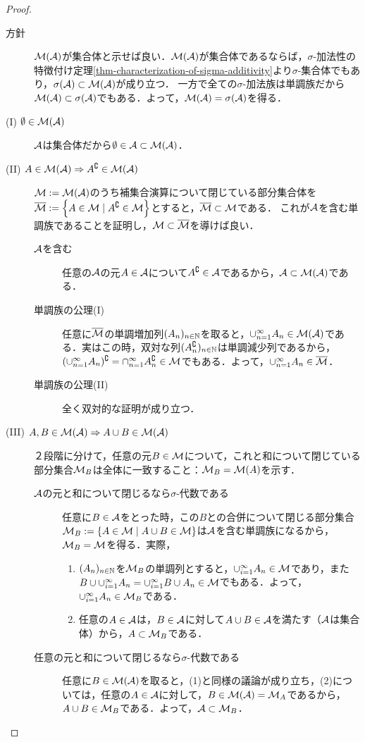 \documentclass[uplatex, dvipdfmx]{jsreport}
\begin{document}
\begin{proof}\mbox{}
    \begin{description}
        \item[方針] $\mathcal{M}(\mathcal{A})$が集合体と示せば良い．$\mathcal{M}(\mathcal{A})$が集合体であるならば，$\sigma$-加法性の特徴付け定理\ref{thm-characterization-of-sigma-additivity}より$\sigma$-集合体でもあり，$\sigma(\mathcal{A})\subset\mathcal{M}(\mathcal{A})$が成り立つ．
        一方で全ての$\sigma$-加法族は単調族だから$\mathcal{M}(\mathcal{A})\subset\sigma(\mathcal{A})$でもある．よって，$\mathcal{M}(\mathcal{A})=\sigma(\mathcal{A})$を得る．
        \item[(I) $\emptyset\in\mathcal{M}(\mathcal{A})$]
        $\mathcal{A}$は集合体だから$\emptyset\in\mathcal{A}\subset\mathcal{M}(\mathcal{A})$．
        \item[(II) $A\in\mathcal{M}(\mathcal{A})\Rightarrow A^\complement\in\mathcal{M}(\mathcal{A})$]
        $\mathcal{M}:=\mathcal{M}(\mathcal{A})$のうち補集合演算について閉じている部分集合体を$\overline{\mathcal{M}}:=\left\{A\in\mathcal{M}\mid A^\complement\in\mathcal{M}\right\}$とすると，$\overline{\mathcal{M}}\subset\mathcal{M}$である．
        これが$\mathcal{A}$を含む単調族であることを証明し，$\mathcal{M}\subset\overline{\mathcal{M}}$を導けば良い．
        \begin{description}
            \item[$\mathcal{A}$を含む] 任意の$\mathcal{A}$の元$A\in\mathcal{A}$について$A^\complement\in\mathcal{A}$であるから，$\mathcal{A}\subset\mathcal{M}(\mathcal{A})$である．
            \item[単調族の公理(I)] 任意に$\overline{\mathcal{M}}$の単調増加列$(A_n)_{n\in\mathbb{N}}$を取ると，$\cup^\infty_{n=1}A_n\in\mathcal{M}(\mathcal{A})$である．実はこの時，双対な列$(A_n^\complement)_{n\in\mathbb{N}}$は単調減少列であるから，$(\cup^\infty_{n=1}A_n)^\complement=\cap^\infty_{n=1}A_n^\complement\in\mathcal{M}$でもある．よって，$\cup^\infty_{n=1}A_n\in\overline{\mathcal{M}}$．
            \item[単調族の公理(II)] 全く双対的な証明が成り立つ．
        \end{description}
        \item[(III) $A,B\in\mathcal{M}(\mathcal{A})\Rightarrow A\cup B\in\mathcal{M}(\mathcal{A})$] ２段階に分けて，任意の元$B\in\mathcal{M}$について，これと和について閉じている部分集合$\mathcal{M}_B$は全体に一致すること：$\mathcal{M}_B=\mathcal{M}(A)$を示す．
            \begin{description}
                \item[$\mathcal{A}$の元と和について閉じるなら$\sigma$-代数である] 任意に$B\in\mathcal{A}$をとった時，この$B$との合併について閉じる部分集合$\mathcal{M}_B:=\left\{A\in\mathcal{M}\mid A\cup B\in\mathcal{M}\right\}$は$\mathcal{A}$を含む単調族になるから，$\mathcal{M}_B=\mathcal{M}$を得る．実際，
                \begin{enumerate}
                    \item $(A_n)_{n\in\mathbb{N}}$を$\mathcal{M}_B$の単調列とすると，$\cup_{i=1}^\infty A_n\in\mathcal{M}$であり，また$B\cup\cup_{i=1}^\infty A_n=\cup_{i=1}^\infty B\cup A_n\in\mathcal{M}$でもある．よって，$\cup_{i=1}^\infty A_n\in\mathcal{M}_B$である．
                    \item 任意の$A\in\mathcal{A}$は，$B\in\mathcal{A}$に対して$A\cup B\in\mathcal{A}$を満たす（$\mathcal{A}$は集合体）から，$A\subset\mathcal{M}_B$である．
                \end{enumerate}
                \item[任意の元と和について閉じるなら$\sigma$-代数である] 
                任意に$B\in\mathcal{M}(\mathcal{A})$を取ると，(1)と同様の議論が成り立ち，(2)については，任意の$A\in\mathcal{A}$に対して，$B\in \mathcal{M}(\mathcal{A})=\mathcal{M}_A$であるから，$A\cup B\in\mathcal{M}_B$である．よって，$\mathcal{A}\subset\mathcal{M}_B$．
            \end{description}
    \end{description}
\end{proof}
\end{document}
